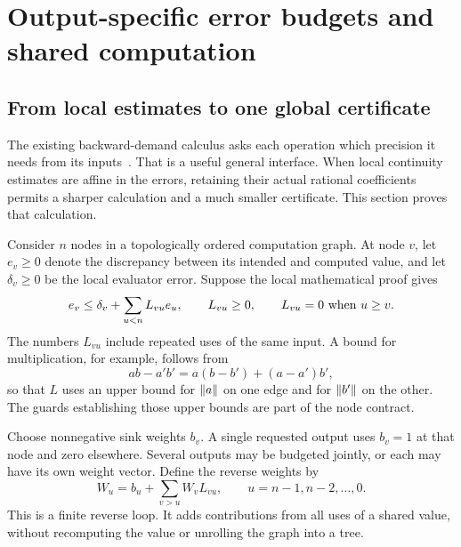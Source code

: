 \section{Output-specific error budgets and shared computation}\label{sec:budgets}

\subsection{From local estimates to one global certificate}

The existing backward-demand calculus asks each operation which precision it needs from its inputs~\cite{repo-dag}. That is a useful general interface. When local continuity estimates are affine in the errors, retaining their actual rational coefficients permits a sharper calculation and a much smaller certificate. This section proves that calculation.

Consider $n$ nodes in a topologically ordered computation graph. At node $v$, let $e_v\ge0$ denote the discrepancy between its intended and computed value, and let $\delta_v\ge0$ be the local evaluator error. Suppose the local mathematical proof gives
\begin{equation}\label{eq:local-error}
 e_v\le\delta_v+\sum_{u<n}L_{vu}e_u,
 \qquad L_{vu}\ge0,
 \qquad L_{vu}=0\ \hbox{when }u\ge v.
\end{equation}
The numbers $L_{vu}$ include repeated uses of the same input. A bound for multiplication, for example, follows from
\[
 ab-a'b'=a(b-b')+(a-a')b',
\]
so that $L$ uses an upper bound for $\lVert a\rVert$ on one edge and for $\lVert b'\rVert$ on the other. The guards establishing those upper bounds are part of the node contract.

Choose nonnegative sink weights $b_v$. A single requested output uses $b_v=1$ at that node and zero elsewhere. Several outputs may be budgeted jointly, or each may have its own weight vector. Define the reverse weights by
\begin{equation}\label{eq:reverse-weight}
 W_u=b_u+\sum_{v>u}W_vL_{vu},
 \qquad u=n-1,n-2,\ldots,0.
\end{equation}
This is a finite reverse loop. It adds contributions from all uses of a shared value, without recomputing the value or unrolling the graph into a tree.

